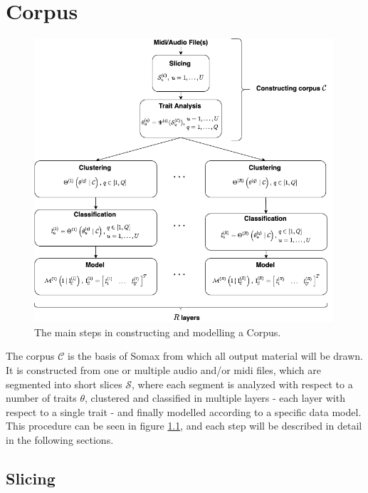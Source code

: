 \chapter{Corpus}\label{sec:3-corpus}
 \begin{figure}[h!]
    \centering        
 	\includegraphics[width=0.99\textwidth]{figures/3-somax-corpus.png}
    \caption{The main steps in constructing and modelling a Corpus.}
    \label{fig:3-somax-corpus}
\end{figure}

\noindent The corpus $\mathcal C$ is the basis of Somax from which all output material will be drawn. It is constructed from one or multiple audio and/or midi files, which are segmented into short slices $\mathcal{S}$, where each segment is analyzed with respect to a number of traits $\theta$, clustered and classified in multiple layers - each layer with respect to a single trait -  and finally modelled according to a specific data model. This procedure can be seen in figure \ref{fig:3-somax-corpus}, and each step will be described in detail in the following sections.

\section{Slicing}\label{sec:3-corpus-slicing}

